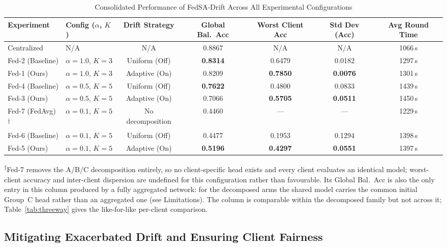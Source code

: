 \documentclass{ieeeaccess}
\newcommand{\sadrift}{FedSA-Drift}
\begin{document}
\begin{table}[t]
\centering
\caption{Consolidated Performance of \sadrift{} Across All Experimental Configurations}
\label{tab:consolidated_performance}
\begin{tabular}{llccccc}
\toprule
Experiment & Config ($\alpha$, $K$) & Drift Strategy & Global Bal.\ Acc & Worst Client Acc & Std Dev (Acc) & Avg Round Time \\
\midrule
Centralized & N/A & N/A & 0.8867 & N/A & N/A & 1066\,s \\
Fed-2 (Baseline) & $\alpha{=}1.0$, $K{=}3$ & Uniform (Off) & \textbf{0.8314} & 0.6479 & 0.0182 & 1297\,s \\
Fed-1 (Ours) & $\alpha{=}1.0$, $K{=}3$ & Adaptive (On) & 0.8209 & \textbf{0.7850} & \textbf{0.0076} & 1301\,s \\
Fed-4 (Baseline) & $\alpha{=}0.5$, $K{=}5$ & Uniform (Off) & \textbf{0.7622} & 0.4800 & 0.0833 & 1439\,s \\
Fed-3 (Ours) & $\alpha{=}0.5$, $K{=}5$ & Adaptive (On) & 0.7066 & \textbf{0.5705} & \textbf{0.0511} & 1450\,s \\
\midrule
Fed-7 (FedAvg)\textsuperscript{$\dagger$} & $\alpha{=}0.1$, $K{=}5$ & No decomposition & 0.4460 & --- & --- & 1229\,s \\
Fed-6 (Baseline) & $\alpha{=}0.1$, $K{=}5$ & Uniform (Off) & 0.4477 & 0.1953 & 0.1294 & 1398\,s \\
Fed-5 (Ours) & $\alpha{=}0.1$, $K{=}5$ & Adaptive (On) & \textbf{0.5196} & \textbf{0.4297} & \textbf{0.0551} & 1397\,s \\
\bottomrule
\end{tabular}

\vspace{2pt}
{\footnotesize \textsuperscript{$\dagger$}Fed-7 removes the A/B/C decomposition entirely, so no client-specific head exists and every client evaluates an identical model; worst-client accuracy and inter-client dispersion are undefined for this configuration rather than favourable. Its Global Bal.\ Acc is also the only entry in this column produced by a fully aggregated network: for the decomposed arms the shared model carries the common initial Group~C head rather than an aggregated one (see Limitations). The column is comparable within the decomposed family but not across it; Table~\ref{tab:threeway} gives the like-for-like per-client comparison.}
\end{table}

\subsection{Mitigating Exacerbated Drift and Ensuring Client Fairness}
\end{document}
